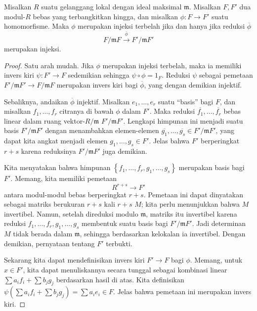 \begin{proposition} \label{splitcriterion1}
Misalkan $R$ suatu gelanggang lokal dengan ideal maksimal $\mathfrak{m}$. Misalkan $F, F'$ dua
modul-$R$ bebas yang terbangkitkan hingga, dan misalkan $\phi: F \to F'$ suatu homomorfisme. 
Maka $\phi$ merupakan injeksi terbelah jika dan hanya jika reduksi $\overline{\phi}$
\[ F/\mathfrak{m}F \stackrel{\overline{\phi}}{\to} F'/\mathfrak{m}F'  \]
merupakan injeksi. 
\end{proposition}
\begin{proof} 
Satu arah mudah. Jika $\phi$ merupakan injeksi terbelah, maka ia memiliki invers
kiri
$\psi: F' \to F$ sedemikian sehingga $\psi \circ \phi = 1_F$. Reduksi $\psi$ sebagai
pemetaan $F'/\mathfrak{m}F' \to F/\mathfrak{m}F$ merupakan invers kiri bagi
$\overline{\phi}$, yang dengan demikian injektif.

Sebaliknya, andaikan $\overline{\phi}$ injektif. Misalkan $e_1, \dots, e_r$ suatu
``basis'' bagi $F$, dan misalkan $f_1, \dots, f_r$ citranya di bawah $\phi$ dalam
$F'$. Maka reduksi $\overline{f_1}, \dots, \overline{f_r}$ bebas
linear dalam ruang vektor-$R/\mathfrak{m}$ $F'/\mathfrak{m}F'$. Lengkapi
himpunan ini menjadi suatu basis $F'/\mathfrak{m}F'$ dengan menambahkan elemen-elemen
$\overline{g_1}, \dots, \overline{g_s} \in F'/\mathfrak{m}F'$, yang dapat
kita angkat menjadi elemen $g_1, \dots, g_s \in F'$. Jelas bahwa $F'$ berperingkat $r+s $
karena reduksinya $F'/\mathfrak{m}F'$ juga demikian.

Kita menyatakan bahwa himpunan $\left\{f_1, \dots, f_r, g_1, \dots, g_s\right\}$ merupakan
basis bagi $F'$. Memang, kita memiliki pemetaan 
\[ R^{r+s} \to F'  \]
antara modul-modul bebas berperingkat $r+s$. Pemetaan ini dapat dinyatakan sebagai matriks berukuran $r+s$ kali $r+s$
$M$; kita perlu menunjukkan bahwa $M$ invertibel. Namun, setelah direduksi modulo
$\mathfrak{m}$, matriks itu invertibel karena reduksi $f_1, \dots, f_r,
g_1, \dots, g_s$ membentuk suatu basis bagi $F'/\mathfrak{m}F'$. 
Jadi determinan $M$ tidak berada dalam $\mathfrak{m}$, sehingga berdasarkan kelokalan ia
invertibel. 
Dengan demikian, pernyataan tentang $F'$ terbukti.

Sekarang kita dapat mendefinisikan invers kiri $F' \to F$ bagi $\phi$. Memang, untuk $x \in F'$,
kita dapat menuliskannya secara tunggal sebagai kombinasi linear $\sum a_i f_i + \sum b_j g_j$
berdasarkan hasil di atas. Kita definisikan $\psi(\sum a_i f_i + \sum b_j g_j) = \sum a_i e_i \in
F$. Jelas bahwa pemetaan ini merupakan invers kiri.
\end{proof} 

